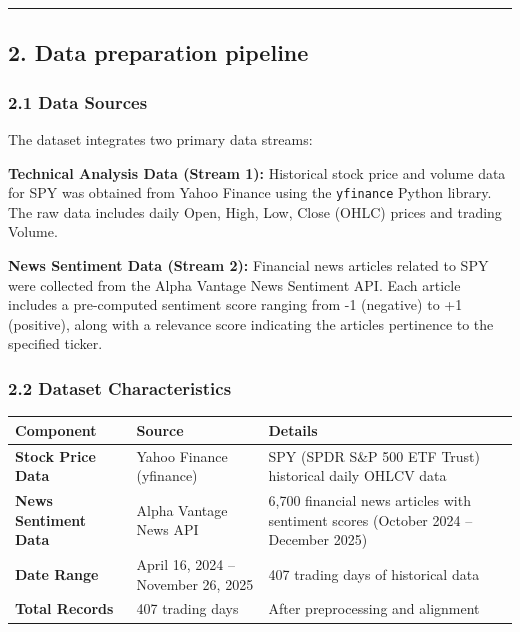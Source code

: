 \documentclass[
]{article}
\newcounter{none} %
\begin{document}
\begin{center}\rule{0.5\linewidth}{0.5pt}\end{center}

\subsection{2. Data preparation
pipeline}\label{2-data-preparation-pipeline}

\subsubsection{2.1 Data Sources}\label{21-data-sources}

The dataset integrates two primary data streams:

\textbf{Technical Analysis Data (Stream 1):} Historical stock price and
volume data for SPY was obtained from Yahoo Finance using the
\texttt{yfinance} Python library. The raw data includes daily Open,
High, Low, Close (OHLC) prices and trading Volume.

\textbf{News Sentiment Data (Stream 2):} Financial news articles related
to SPY were collected from the Alpha Vantage News Sentiment API. Each
article includes a pre-computed sentiment score ranging from -1
(negative) to +1 (positive), along with a relevance score indicating the
article\textquotesingle s pertinence to the specified ticker.

\subsubsection{2.2 Dataset
Characteristics}\label{22-dataset-characteristics}

{\def\LTcaptype{none} %
\begin{longtable}[]{@{}lll@{}}
\toprule\noalign{}
Component & Source & Details \\
\midrule\noalign{}
\endhead
\bottomrule\noalign{}
\endlastfoot
\textbf{Stock Price Data} & Yahoo Finance (yfinance) & SPY (SPDR S\&P
500 ETF Trust) historical daily OHLCV data \\
\textbf{News Sentiment Data} & Alpha Vantage News API & 6,700 financial
news articles with sentiment scores (October 2024 -- December 2025) \\
\textbf{Date Range} & April 16, 2024 -- November 26, 2025 & 407 trading
days of historical data \\
\textbf{Total Records} & 407 trading days & After preprocessing and
alignment \\
\end{longtable}
}
\end{document}
